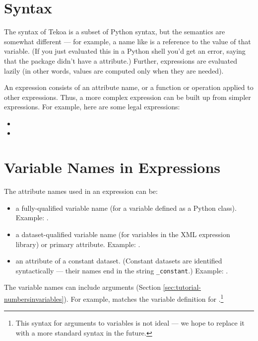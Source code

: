 \section{Syntax}

The syntax of Tekoa is a subset of Python syntax, but the semantics are
somewhat different --- for example, a name like
 is a reference to the value of that
variable.  (If you just evaluated this in a Python shell you'd get an
error, saying that the  package didn't have a
 attribute.)  Further, expressions are evaluated
lazily (in other words, values are computed only when they are needed).

An expression consists of an attribute name, or a function or operation
applied to other expressions.  Thus, a more complex expression can be built
up from simpler expressions.  For example, here are some legal expressions:

\begin{itemize}

\item {}
\item {}

\end{itemize}

\section{Variable Names in Expressions}

The attribute names used in an expression can be:

\begin{itemize}
\item a fully-qualified variable name (for a variable defined as a Python
  class).  Example: .

\item a dataset-qualified variable name (for variables in the XML
  expression library) or primary attribute.  Example:
  .

\item an attribute of a constant dataset.  (Constant datasets are
  identified syntactically --- their names end in the string \verb|_constant|.)
  Example: .

\end{itemize}

The variable names can include arguments (Section
\ref{sec:tutorial-numbersinvariables}). For example, 
matches the variable definition for
.\footnote{This syntax for arguments
  to variables is not ideal --- we hope to replace it with a more standard
  syntax in the future.}

